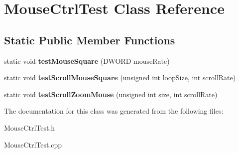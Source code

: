 \hypertarget{class_mouse_ctrl_test}{\section{Mouse\+Ctrl\+Test Class Reference}
\label{class_mouse_ctrl_test}
}
\subsection*{Static Public Member Functions}
\begin{DoxyCompactItemize}
\item 
\hypertarget{class_mouse_ctrl_test_abee52a50d9a7bb594302c8333dafe5da}{static void {\bfseries test\+Mouse\+Square} (D\+W\+O\+R\+D mouse\+Rate)}\label{class_mouse_ctrl_test_abee52a50d9a7bb594302c8333dafe5da}

\item 
\hypertarget{class_mouse_ctrl_test_a0b148c4f595fbc9ef74d840d042f1807}{static void {\bfseries test\+Scroll\+Mouse\+Square} (unsigned int loop\+Size, int scroll\+Rate)}\label{class_mouse_ctrl_test_a0b148c4f595fbc9ef74d840d042f1807}

\item 
\hypertarget{class_mouse_ctrl_test_a28045c215d3f54217f7221ec959d4a98}{static void {\bfseries test\+Scroll\+Zoom\+Mouse} (unsigned int size, int scroll\+Rate)}\label{class_mouse_ctrl_test_a28045c215d3f54217f7221ec959d4a98}

\end{DoxyCompactItemize}


The documentation for this class was generated from the following files\+:\begin{DoxyCompactItemize}
\item 
Mouse\+Ctrl\+Test.\+h\item 
Mouse\+Ctrl\+Test.\+cpp\end{DoxyCompactItemize}
